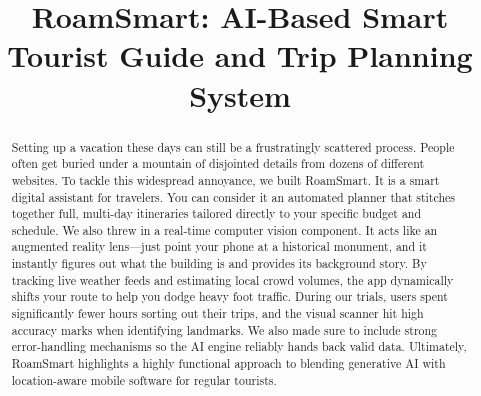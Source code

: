 \documentclass[conference]{IEEEtran}
\begin{document}
\title{RoamSmart: AI-Based Smart Tourist Guide and Trip Planning System}

\author{
\and
{}
\and
{}
\and
{}
\and
{}
}

\maketitle

\begin{abstract}
Setting up a vacation these days can still be a frustratingly scattered process. People often get buried under a mountain of disjointed details from dozens of different websites. To tackle this widespread annoyance, we built RoamSmart. It is a smart digital assistant for travelers. You can consider it an automated planner that stitches together full, multi-day itineraries tailored directly to your specific budget and schedule. We also threw in a real-time computer vision component. It acts like an augmented reality lens—just point your phone at a historical monument, and it instantly figures out what the building is and provides its background story. By tracking live weather feeds and estimating local crowd volumes, the app dynamically shifts your route to help you dodge heavy foot traffic. During our trials, users spent significantly fewer hours sorting out their trips, and the visual scanner hit high accuracy marks when identifying landmarks. We also made sure to include strong error-handling mechanisms so the AI engine reliably hands back valid data. Ultimately, RoamSmart highlights a highly functional approach to blending generative AI with location-aware mobile software for regular tourists.
\end{abstract}
\end{document}
